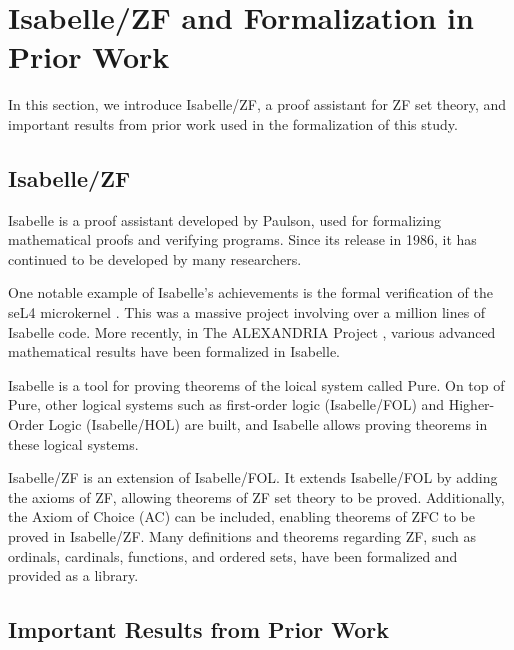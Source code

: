 \documentclass{report}
\begin{document}
\section{Isabelle/ZF and Formalization in Prior Work}
In this section, we introduce Isabelle/ZF, a proof assistant for ZF set theory, 
and important results from prior work used in the formalization of this study.

\subsection{Isabelle/ZF}
Isabelle\cite{paulson_1986} is a proof assistant developed by Paulson, used for formalizing mathematical proofs and verifying programs. 
Since its release in 1986, it has continued to be developed by many researchers.

One notable example of Isabelle's achievements is the formal verification of the seL4 microkernel \cite{seL4}.
This was a massive project involving over a million lines of Isabelle code. 
More recently, in The ALEXANDRIA Project \cite{alexiandria}, various advanced mathematical results have been formalized in Isabelle.

Isabelle is a tool for proving theorems of the loical system called Pure. 
On top of Pure, other logical systems such as first-order logic (Isabelle/FOL) and Higher-Order Logic (Isabelle/HOL) are built,
and Isabelle allows proving theorems in these logical systems.

Isabelle/ZF is an extension of Isabelle/FOL.
It extends Isabelle/FOL by adding the axioms of ZF, allowing theorems of ZF set theory to be proved.
Additionally, the Axiom of Choice (AC) can be included, enabling theorems of ZFC to be proved in Isabelle/ZF.
Many definitions and theorems regarding ZF, such as ordinals, cardinals, functions, and ordered sets, 
have been formalized and provided as a library.

\subsection{Important Results from Prior Work}
\end{document}
